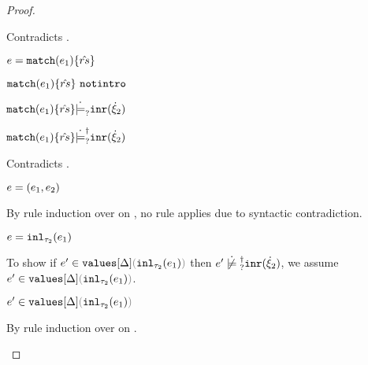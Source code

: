 \begin{proof}
\begin{byCases}
\begin{byCases}
\begin{byCases}
          Contradicts . 
        \item[\text{(\ref{rule:IMatch})}]
          \begin{pfsteps*}
          \item $e=\mathtt{match}(e_1) \{\hat{rs}\}$ 
          \item $\mathtt{match}(e_1) \{\hat{rs}\} ~\mathtt{notintro}$ 
          \item $\mathtt{match}(e_1) \{\hat{rs}\} \dot{\models}_{?} \mathtt{inr}(\dot{\xi}_2)$
             
          \item $\mathtt{match}(e_1) \{\hat{rs}\} \dot{\models}_{?}^{\dag} \mathtt{inr}(\dot{\xi}_2)$
          \end{pfsteps*}
          Contradicts . 
        \item[\text{(\ref{rule:IPairL}), (\ref{rule:IPairR}),
            (\ref{rule:IPair})}]
          \begin{pfsteps*}
          \item $e=(e_1 , e_2)$ 
          \end{pfsteps*}
          By rule induction over  on , no
          rule applies due to syntactic contradiction. 
        \item[\text{(\ref{rule:IInl})}]
          \begin{pfsteps*}
          \item $e=\mathtt{inl}_{\tau_2}({e_1})$ 
          \end{pfsteps*}
          To show if $\inValues{e'}{\Delta}{\hinl{\tau_2}{e_1}}$ then
          $\cnotsatisfyormay{e'}{\cinr{\hxi_2}}$, we assume
          $\inValues{e'}{\Delta}{\hinl{\tau_2}{e_1}}$.
          \begin{pfsteps*}
          \item $\inValues{e'}{\Delta}{\hinl{\tau_2}{e_1}}$ 
          \end{pfsteps*}
          By rule induction over  on
          .
          \begin{byCases}
          \item[\text{(\ref{rule:IVVal})}]

\end{byCases}
\end{byCases}
\end{byCases}
\end{byCases}
\end{proof}
